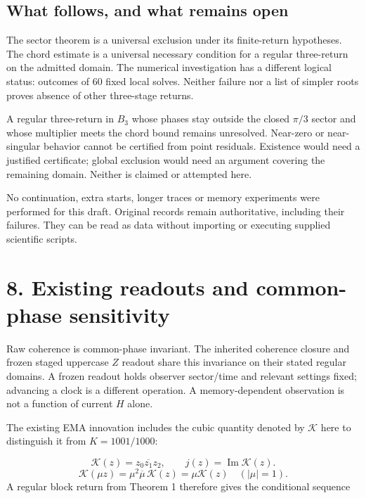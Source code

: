 \documentclass[11pt,a4paper]{article}
\begin{document}
\subsection*{What follows, and what remains open}
The sector theorem is a universal exclusion under its finite-return hypotheses. The chord estimate is a universal necessary condition for a regular three-return on the admitted domain. The numerical investigation has a different logical status: outcomes of 60 fixed local solves. Neither failure nor a list of simpler roots proves absence of other three-stage returns.

A regular three-return in $B_3$ whose phases stay outside the closed $\pi/3$ sector and whose multiplier meets the chord bound remains unresolved. Near-zero or near-singular behavior cannot be certified from point residuals. Existence would need a justified certificate; global exclusion would need an argument covering the remaining domain. Neither is claimed or attempted here.

No continuation, extra starts, longer traces or memory experiments were performed for this draft. Original records remain authoritative, including their failures. They can be read as data without importing or executing supplied scientific scripts.

\clearpage
\section*{8. Existing readouts and common-phase sensitivity}
Raw coherence is common-phase invariant. The inherited coherence closure and frozen staged uppercase $Z$ readout share this invariance on their stated regular domains. A frozen readout holds observer sector/time and relevant settings fixed; advancing a clock is a different operation. A memory-dependent observation is not a function of current $H$ alone. \cite{OBS} \cite{Z}

The existing EMA innovation includes the cubic quantity denoted by $\mathcal{K}$ here to distinguish it from $K=1001/1000$: \cite{Z}

\begin{equation}\mathcal{K}(z)=z_0\overline{z_1}z_2,\qquad j(z)=\operatorname{Im}\mathcal{K}(z).\end{equation}
\begin{equation}\mathcal{K}(\mu z)=\mu^2\overline{\mu}\,\mathcal{K}(z)=\mu\mathcal{K}(z)\quad(|\mu|=1).\end{equation}
A regular block return from Theorem 1 therefore gives the conditional sequence
\end{document}
